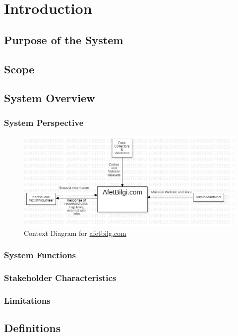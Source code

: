 \section{Introduction}

\subsection{Purpose of the System}

\subsection{Scope}

\subsection{System Overview}

\subsubsection{System Perspective}

\begin{figure}[H]
  \centering
  \includegraphics[width=\textwidth]{img/context-diagram.jpg}
  \caption{Context Diagram for \href{https://afetbilgi.com}{afetbilg.com}}
\end{figure}

\subsubsection{System Functions}

\subsubsection{Stakeholder Characteristics}

\subsubsection{Limitations}

\subsection{Definitions}

